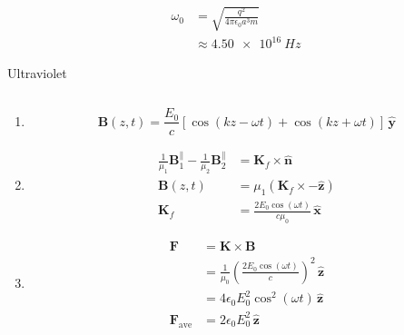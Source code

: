 \documentclass{article}
\renewcommand{\vec}[1]{\boldsymbol{\mathbf{#1}}}
\newcommand{\uvec}[1]{\hat{\vec{#1}}}
\begin{document}
\subsection{}

\begin{align*}
  \omega_0 & = \sqrt{\frac{q^2}{4 \pi \epsilon_0 a^3 m}} \\
           & \approx \qty{4.50e16}{Hz}
\end{align*}

Ultraviolet

\setcounter{subsection}{33}
\subsection{}

\begin{enumerate}
  \item \[\vec{B}(z, t) = \frac{E_0}{c} [\cos (k z - \omega t) + \cos (k z + \omega t)] \,\uvec{y}\]

  \item

        \begin{align*}
          \frac{1}{\mu_1} \vec{B}_1^\parallel - \frac{1}{\mu_2} \vec{B}_2^\parallel & = \vec{K}_f \times \uvec{n}                        \\
          \vec{B}(z, t)                                                             & = \mu_1 (\vec{K}_f \times -\uvec{z})               \\
          \vec{K}_f                                                                 & = \frac{2 E_0 \cos (\omega t)}{c \mu_0} \,\uvec{x}
        \end{align*}

  \item

        \begin{align*}
          \vec{F}            & = \vec{K} \times \vec{B}                                                      \\
                             & = \frac{1}{\mu_0} \left( \frac{2 E_0 \cos (\omega t)}{c} \right)^2 \,\uvec{z} \\
                             & = 4 \epsilon_0 E_0^2 \cos^2 (\omega t) \,\uvec{z}                             \\
          \vec{F}_\text{ave} & = 2 \epsilon_0 E_0^2 \,\uvec{z}
        \end{align*}
\end{enumerate}
\end{document}
